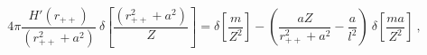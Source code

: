 \begin{equation}
4\pi\frac{H'(r_{++})}{(r_{++}^2+a^2)} \ \delta \left[\frac{(r_{++}^2+a^2)}{Z}\right] =
\delta\left[ \frac{m}{Z^2}\right] - \left( \frac{aZ}{r_{++}^2+a^2} - \frac{a}{l^2} \right) \ \delta \left[\frac{ma}{Z^2}\right] \ ,
\label{identity}
\end{equation}

